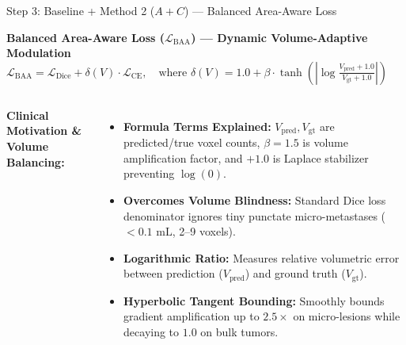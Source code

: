 \documentclass[aspectratio=169, 10pt]{beamer}
\begin{document}
\begin{frame}{Step 3: Baseline + Method 2 ($A + C$) --- Balanced Area-Aware Loss}
  \begin{block}{\small \textbf{Balanced Area-Aware Loss ($\mathcal{L}_{\text{BAA}}$) --- Dynamic Volume-Adaptive Modulation}}
    \centering
    $\mathcal{L}_{\text{BAA}} = \mathcal{L}_{\text{Dice}} + \delta(V) \cdot \mathcal{L}_{\text{CE}}, \quad \text{where } \delta(V) = 1.0 + \beta \cdot \tanh\left( \left| \log \frac{V_{\text{pred}} + 1.0}{V_{\text{gt}} + 1.0} \right| \right)$
    
    \vspace{2pt}
  \end{block}
  
  \vspace{0.15cm}
  \begin{columns}[T]
    \textbf{Clinical Motivation \& Volume Balancing:}
    \begin{itemize}\itemsep=3pt
      \scriptsize
      \item \textbf{Formula Terms Explained:} $V_{\text{pred}}, V_{\text{gt}}$ are predicted/true voxel counts, $\beta=1.5$ is volume amplification factor, and $+1.0$ is Laplace stabilizer preventing $\log(0)$.
      \item \textbf{Overcomes Volume Blindness:} Standard Dice loss denominator ignores tiny punctate micro-metastases ($<0.1\text{ mL}$, 2--9 voxels).
      \item \textbf{Logarithmic Ratio:} Measures relative volumetric error between prediction ($V_{\text{pred}}$) and ground truth ($V_{\text{gt}}$).
      \item \textbf{Hyperbolic Tangent Bounding:} Smoothly bounds gradient amplification up to $2.5\times$ on micro-lesions while decaying to $1.0$ on bulk tumors.
    \end{itemize}
    

\end{columns}
\end{frame}
\end{document}
